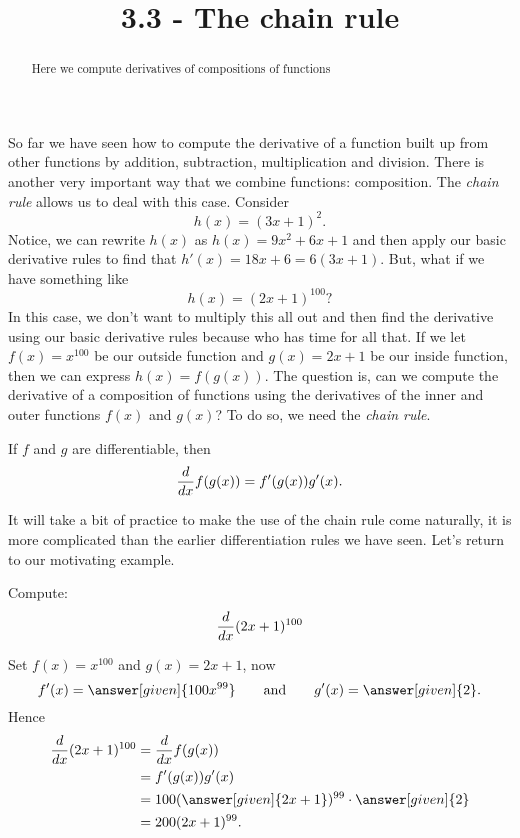 \documentclass{ximera}
\title{3.3 - The chain rule}
\begin{document}
\begin{abstract}
  Here we compute derivatives of compositions of functions
\end{abstract}
\maketitle


So far we have seen how to compute the derivative of a function built up from other functions by addition, subtraction, multiplication and
division. There is another very important way that we combine
functions: composition. The \textit{chain rule} allows us to deal with
this case. Consider
\[
h(x) = (3x+1)^2.
\] 
Notice, we can rewrite $h(x)$ as $h(x)=9x^2+6x+1$ and then apply our basic derivative rules to find that $h'(x)=18x+6=6(3x+1)$. But, what if we have something like 
\[h(x)=(2x+1)^{100}?\]
In this case, we don't want to multiply this all out and then find the derivative using our basic derivative rules because who has time for all that.
If we let $f(x) = x^{100}$ be our outside function and $g(x) = 2x+1$ be our inside function, then we can express
$h(x) = f(g(x))$. The question is, can we compute the derivative of a
composition of functions using the derivatives of the inner and outer functions
$f(x)$ and $g(x)$? To do so, we need the \textit{chain rule}.



\begin{theorem}
If $f$ and $g$ are differentiable, then
\[
\frac{d}{\mathop{}\!d x} f(g(x)) = f'(g(x))g'(x).
\]
\end{theorem}



It will take a bit of practice to make the use of the chain rule come
naturally, it is more complicated than the earlier differentiation
rules we have seen. Let's return to our motivating example.

\begin{example}
Compute:
\[
\frac{d}{\mathop{}\!d x} (2x+1)^{100}
\]

\begin{explanation}
Set $f(x) = x^{100}$ and $g(x) = 2x+1$, now
\[
f'(x) = \answer[given]{100x^{99}} \qquad\text{and}\qquad g'(x) = \answer[given]{2}.
\]
Hence
\begin{align*}
\ddx (2x+1)^{100} &= \ddx f(g(x))\\ 
&=f'(g(x))g'(x) \\
&= 100(\answer[given]{2x+1})^{99}\cdot \answer[given]{2}\\
&= 200(2x+1)^{99}.
\end{align*}
\end{explanation}
\end{example}
\end{document}
